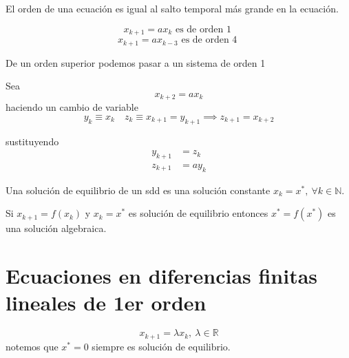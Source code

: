 	 \begin{tcolorbox}[colback=Black!4, colframe=White,arc=2mm]
	 \begin{definicion}
	 	El orden de una ecuación es igual al salto temporal más grande en la ecuación.
	 \end{definicion}
	 \end{tcolorbox}
	 \begin{ejemplo}
		 \begin{equation*}
		   x_{k+1} = ax_{k} \text{ es de orden 1 } 
		 \end{equation*}
		 \begin{equation*}
		   x_{k+1}=ax_{k-3} \text{ es de orden 4 } 
		 \end{equation*}
	 \end{ejemplo}
	 \begin{tcolorbox}[colback=Black!4, colframe=White,arc=2mm]
	 \begin{nota}De un orden superior podemos pasar a un sistema de orden 1
	 \end{nota}
	 \end{tcolorbox}
	 \begin{ejemplo}
	 	Sea \begin{equation*}
	 	  x_{k+2} = ax_k 
	 	\end{equation*}
		haciendo un cambio de variable
		\begin{equation*}
		  y_k \equiv x_k \quad z_k \equiv  x_{k+1} = y_{k+1} \implies z_{k+1}=x_{k+2}
		\end{equation*}

		sustituyendo
		\begin{align*}
		  y_{k+1} &= z_k \\
			z_{k+1} &= ay_k
		\end{align*}
	 \end{ejemplo}

	 \begin{tcolorbox}[colback=Black!4, colframe=White,arc=2mm]
	 \begin{definicion}
		 Una solución de equilibrio de un sdd es una solución constante $x_k = x^*,\ \forall k \in \mathbb{N}$.
	 \end{definicion}
	 \end{tcolorbox}
	 Si $x_{k+1}=f(x_k)$ y $x_{k}=x^*$ es solución de equilibrio entonces $x^*=f(x^*)$ es una solución algebraica.

	 \section{Ecuaciones en diferencias finitas lineales de 1er orden}
	 \begin{equation*}
	   x_{k+1}=\lambda x_{k},\ \lambda \in \mathbb{R} 
	 \end{equation*}
	 notemos que $x^*=0$ siempre es solución de equilibrio.

